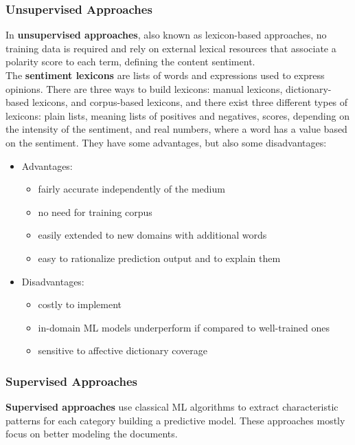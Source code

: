 \documentclass{article}
\begin{document}
\subsubsection{Unsupervised Approaches}
In \textbf{unsupervised approaches}, also known as lexicon-based approaches, no training data is required and rely on external lexical resources that associate a polarity score to each term, defining the content sentiment. \\
The \textbf{sentiment lexicons} are lists of words and expressions used to express opinions. There are three ways to build lexicons: manual lexicons, dictionary-based lexicons, and corpus-based lexicons, and there exist three different types of lexicons: plain lists, meaning lists of positives and negatives, scores, depending on the intensity of the sentiment, and real numbers, where a word has a value based on the sentiment.
They have some advantages, but also some disadvantages:
\begin{itemize}
    \item Advantages:
        \begin{itemize}
            \item fairly accurate independently of the medium
            \item no need for training corpus
            \item easily extended to new domains with additional words
            \item easy to rationalize prediction output and to explain them
        \end{itemize}
    \item Disadvantages:
        \begin{itemize}
            \item costly to implement
            \item in-domain ML models underperform if compared to well-trained ones
            \item sensitive to affective dictionary coverage
        \end{itemize}
\end{itemize}
\subsubsection{Supervised Approaches}
\textbf{Supervised approaches} use classical ML algorithms to extract characteristic patterns for each category building a predictive model. These approaches mostly focus on better modeling the documents.
\end{document}
